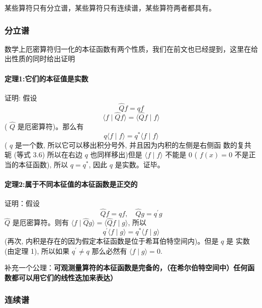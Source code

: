 		某些算符只有分立谱，某些算符只有连续谱，某些算符两者都具有。
			\subsubsection{分立谱}
				数学上厄密算符归一化的本征函数有两个性质，我们在前文也已经提到，这里在给出性质的同时给出证明
					\paragraph*{定理1:它们的本征值是实数\\}
						\par
						证明: 假设
						\begin{equation}
						\hat{Q} f=q f
						\end{equation}
						\begin{equation}
						\langle f \mid \hat{Q} f\rangle=\langle\hat{Q} f \mid f\rangle
						\end{equation}
						( $\hat{Q}$ 是厄密算符)。那么有
						\begin{equation}
						q\langle f \mid f\rangle=q^{*}\langle f \mid f\rangle
						\end{equation}
						( $q$ 是一个数, 所以它可以移出积分号外, 并且因为内积的左侧是右侧函 数的复共轭 (等式 3.6) 所以在右边 $q$ 也同样移出)但是 $\langle f \mid f\rangle$ 不能是 0 ( $f(x)=0$ 不是正当的本征函数), 所以 $q=q^{*}$, 因此 $q$ 是实数。证毕。
					\paragraph*{定理2:属于不同本征值的本征函数是正交的\\}
						\par
						证明：假设
						\begin{equation}
						\hat{Q} f=q f, \quad \hat{Q} g=q^{\prime} g
						\end{equation}
						$\hat{Q}$ 是厄密算符。则有 $\langle f \mid \hat{Q} g\rangle=\langle\hat{Q} f \mid g\rangle$, 所以
						\begin{equation}
						q^{\prime}\langle f \mid g\rangle=q^{*}\langle f \mid g\rangle
						\end{equation}
						(再次, 内积是存在的因为假定本征函数是位于希耳伯特空间内)。但是 $q$ 是 实数 (由定理 1), 所以如果 $q^{\prime} \neq q$ 那么必然有 $\langle f \mid g\rangle=0$.

				补充一个公理：\textbf{可观测量算符的本征函数是完备的，（在希尔伯特空间中）任何函数都可以用它们的线性迭加来表达）}
			\subsubsection{连续谱}
